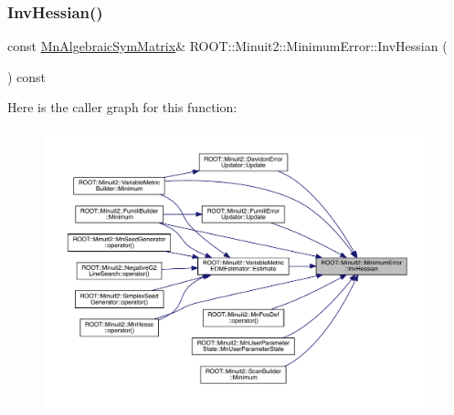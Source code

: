 \mbox{\label{classROOT_1_1Minuit2_1_1MinimumError_acfa9206a47e5fdf2d9aa1928aaf5cd04}} 
\subsubsection{\texorpdfstring{InvHessian()}{InvHessian()}\hspace{0.1cm}{\footnotesize\ttfamily [1/2]}}
{\footnotesize\ttfamily const \mbox{\hyperlink{namespaceROOT_1_1Minuit2_a9e74ad97f5537a2e80e52b04d98ecc6e}{Mn\+Algebraic\+Sym\+Matrix}}\& R\+O\+O\+T\+::\+Minuit2\+::\+Minimum\+Error\+::\+Inv\+Hessian (\begin{DoxyParamCaption}{ }\end{DoxyParamCaption}) const\hspace{0.3cm}{\ttfamily [inline]}}

Here is the caller graph for this function\+:\nopagebreak
\begin{figure}[H]
\begin{center}
\leavevmode
\includegraphics[width=350pt]{d5/d32/classROOT_1_1Minuit2_1_1MinimumError_acfa9206a47e5fdf2d9aa1928aaf5cd04_icgraph}
\end{center}
\end{figure}
\mbox{\label{classROOT_1_1Minuit2_1_1MinimumError_acfa9206a47e5fdf2d9aa1928aaf5cd04}} 
